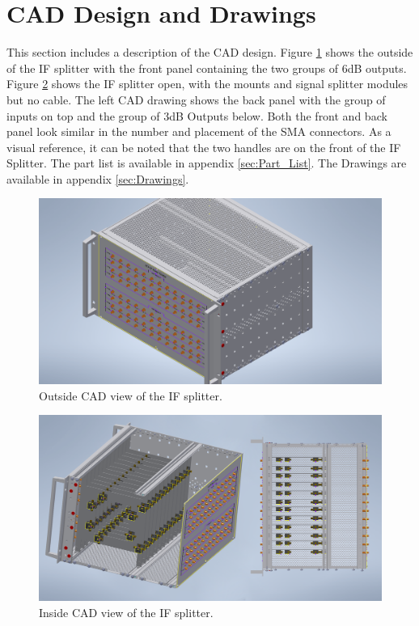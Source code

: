 \documentclass[12pt,a4paper,oneside]{article}
\begin{document}
\section{CAD Design and Drawings}
\label{sec:CAD}
This section includes a description of the CAD design. Figure \ref{fig:CAD_outside} shows the outside of the IF splitter with the front panel containing the two groups of 6dB outputs. Figure \ref{fig:CAD_inside} shows the IF splitter open, with the mounts and signal splitter modules but no cable. The left CAD drawing shows the back panel with the group of inputs on top and the group of 3dB Outputs below. Both the front and back panel look similar in the number and placement of the SMA connectors. As a visual reference, it can be noted that the two handles are on the front of the IF Splitter. The part list is available in appendix \ref{sec:Part_List}. The Drawings are available in appendix \ref{sec:Drawings}.

\hfill \break

%
\begin{figure}[H]
\centering
\includegraphics[width=1\linewidth]{figures/CAD_outside.png}
\caption{Outside CAD view of the IF splitter.}
\label{fig:CAD_outside}
\end{figure}
%

%
\begin{figure}[H]
\centering
\includegraphics[width=1\linewidth]{figures/CAD_inside.png}
\caption{Inside CAD view of the IF splitter.}
\label{fig:CAD_inside}
\end{figure}
%
\end{document}
